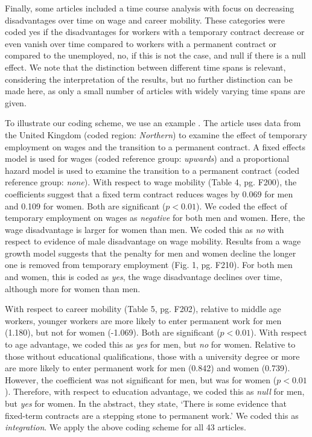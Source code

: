 \documentclass[12pt]{article}
\begin{document}
Finally, some articles included a time course analysis with focus on decreasing disadvantages over time on wage and career mobility.  These categories were coded yes if the disadvantages for workers with a temporary contract decrease or even vanish over time compared to workers with a permanent contract or compared to the unemployed, no, if this is not the case, and null if there is a null effect.  We note that the distinction between different time spans is relevant, considering the interpretation of the results, but no further distinction can be made here, as only a small number of articles with widely varying time spans are given.

To illustrate our coding scheme, we use an example \citep{booth_etal_2002}.  The article uses data from the United Kingdom (coded region: \emph{Northern}) to examine the effect of temporary employment on wages and the transition to a permanent contract.  A fixed effects model is used for wages (coded reference group: \emph{upwards}) and a proportional hazard model is used to examine the transition to a permanent contract (coded reference group: \emph{none}).    With respect to wage mobility (Table 4, pg. F200), the coefficients suggest that a fixed term contract reduces wages by 0.069 for men and 0.109 for women.  Both are significant ($p<0.01$).  We coded the effect of temporary employment on wages as \emph{negative} for both men and women.  Here, the wage disadvantage is larger for women than men.  We coded this as \emph{no} with respect to evidence of male disadvantage on wage mobility.  Results from a wage growth model suggests that the penalty for men and women decline the longer one is removed from temporary employment (Fig. 1, pg. F210).  For both men and women, this is coded as \emph{yes}, the wage disadvantage declines over time, although more for women than men.  

With respect to career mobility (Table 5, pg. F202), relative to middle age workers, younger workers are more likely to enter permanent work for men (1.180), but not for women (-1.069).  Both are significant ($p<0.01$).  With respect to age advantage, we coded this as \emph{yes} for men, but \emph{no} for women.  Relative to those without educational qualifications, those with a university degree or more are more likely to enter permanent work for men (0.842) and women (0.739).  However, the coefficient was not significant for men, but was for women ($p<0.01$).  Therefore, with respect to education advantage, we coded this as \emph{null} for men, but \emph{yes} for women.  In the abstract, they state, `There is some evidence that fixed-term contracts are a stepping stone to permanent work.'  We coded this as \emph{integration}.  We apply the above coding scheme for all 43 articles.  
\end{document}
